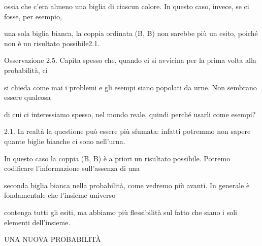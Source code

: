 \documentclass[a4paper,portrait,12pt]{article}
\begin{document}
\begin{flushleft}
ossia che c'era almeno una biglia di ciascun colore. In questo caso, invece, se ci fosse, per esempio,
\end{flushleft}


\begin{flushleft}
una sola biglia bianca, la coppia ordinata (B, B) non sarebbe più un esito, poich\'{e} non \`{e} un risultato possibile2.1.
\end{flushleft}


\begin{flushleft}
Osservazione 2.5. Capita spesso che, quando ci si avvicina per la prima volta alla probabilit\`{a}, ci
\end{flushleft}


\begin{flushleft}
si chieda come mai i problemi e gli esempi siano popolati da urne. Non sembrano essere qualcosa
\end{flushleft}


\begin{flushleft}
di cui ci interessiamo spesso, nel mondo reale, quindi perch\'{e} usarli come esempi?
\end{flushleft}


\begin{flushleft}
2.1. In realt\`{a} la questione pu\`{o} essere più sfumata: infatti potremmo non sapere quante biglie bianche ci sono nell'urna.
\end{flushleft}


\begin{flushleft}
In questo caso la coppia (B, B) \`{e} a priori un risultato possibile. Potremo codificare l'informazione sull'assenza di una
\end{flushleft}


\begin{flushleft}
seconda biglia bianca nella probabilit\`{a}, come vedremo più avanti. In generale \`{e} fondamentale che l'insieme universo
\end{flushleft}


\begin{flushleft}
contenga tutti gli esiti, ma abbiamo più flessibilit\`{a} sul fatto che siano i soli elementi dell'insieme.
\end{flushleft}





\begin{flushleft}
\newpage
UNA NUOVA PROBABILIT\`{A}
\end{flushleft}
\end{document}
